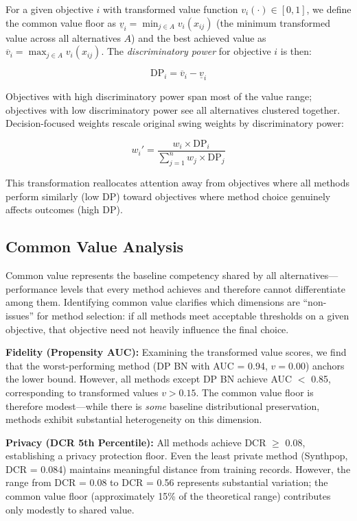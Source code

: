 \documentclass[12pt,a4paper]{article}
\begin{document}
For a given objective $i$ with transformed value function $v_i(\cdot) \in [0,1]$, we define the common value floor as $\underline{v}_i = \min_{j \in A} v_i(x_{ij})$ (the minimum transformed value across all alternatives $A$) and the best achieved value as $\overline{v}_i = \max_{j \in A} v_i(x_{ij})$. The \textit{discriminatory power} for objective $i$ is then:

\begin{equation}
\text{DP}_i = \overline{v}_i - \underline{v}_i
\end{equation}

Objectives with high discriminatory power span most of the value range; objectives with low discriminatory power see all alternatives clustered together. Decision-focused weights rescale original swing weights by discriminatory power:

\begin{equation}
w_i' = \frac{w_i \times \text{DP}_i}{\sum_{j=1}^{n} w_j \times \text{DP}_j}
\end{equation}

This transformation reallocates attention away from objectives where all methods perform similarly (low $\text{DP}$) toward objectives where method choice genuinely affects outcomes (high $\text{DP}$).

\subsection{Common Value Analysis}

Common value represents the baseline competency shared by all alternatives---performance levels that every method achieves and therefore cannot differentiate among them. Identifying common value clarifies which dimensions are ``non-issues'' for method selection: if all methods meet acceptable thresholds on a given objective, that objective need not heavily influence the final choice.

\textbf{Fidelity (Propensity AUC):} Examining the transformed value scores, we find that the worst-performing method (DP BN with AUC = 0.94, $v = 0.00$) anchors the lower bound. However, all methods except DP BN achieve AUC $<$ 0.85, corresponding to transformed values $v > 0.15$. The common value floor is therefore modest---while there is \textit{some} baseline distributional preservation, methods exhibit substantial heterogeneity on this dimension.

\textbf{Privacy (DCR 5th Percentile):} All methods achieve DCR $\geq$ 0.08, establishing a privacy protection floor. Even the least private method (Synthpop, DCR = 0.084) maintains meaningful distance from training records. However, the range from DCR = 0.08 to DCR = 0.56 represents substantial variation; the common value floor (approximately 15\% of the theoretical range) contributes only modestly to shared value.
\end{document}
